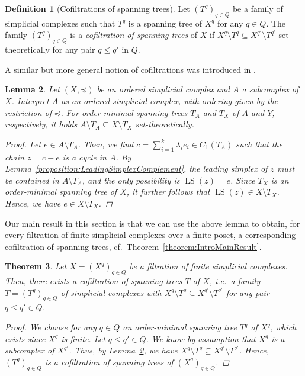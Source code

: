 \documentclass[oneside]{amsart}
\newtheorem{theorem}{Theorem}
\newtheorem{lemma}[theorem]{Lemma}
\theoremstyle{definition}
\newtheorem{definition}[theorem]{Definition}
\DeclareMathOperator\LS{LS}
\begin{document}
\begin{definition}[Cofiltrations of spanning trees]
    \label{definition:CofST}
    Let $(T^q)_{q \in Q}$ be a family of simplicial complexes such that $T^q$ is a spanning tree of $X^q$ for any $q \in Q$.
    The family $(T^q)_{q \in Q}$ is a \emph{cofiltration of spanning trees} of $X$ if $X^q \setminus T^q \subseteq X^{q'} \setminus T^{q'}$ set-theoretically for any pair $q \leq q'$ in $Q$.
\end{definition}

A similar but more general notion of cofiltrations was introduced in \cite{PatelRask2022}.

\begin{lemma}%
    \label{lemma:ClassicComplementInclusion}
    Let $(X, \mathord\preceq)$ be an ordered simplicial complex and $A$ a subcomplex of $X$.
    Interpret $A$ as an ordered simplicial complex, with ordering given by the restriction of $\mathord\preceq$.
    For order-minimal spanning trees $T_A$ and $T_X$ of $A$ and $Y$, respectively, it holds $A \setminus T_A \subseteq X \setminus T_X$ set-theoretically.

    \begin{proof}
        Let $e \in A \setminus T_A$.
        Then, we find $c = \sum_{i = 1}^k \lambda_i e_i \in C_1(T_A)$ such that the chain $z = c - e$ is a cycle in $A$.
        By Lemma~\ref{proposition:LeadingSimplexComplement}, the leading simplex of $z$ must be contained in $A \setminus T_A$, and the only possibility is $\LS(z) = e$.
        Since $T_X$ is an order-minimal spanning tree of $X$, it further follows that $\LS(z) \in X \setminus T_X$.
        Hence, we have $e \in X \setminus T_X$.
    \end{proof}    
\end{lemma}

Our main result in this section is that we can use the above lemma to obtain, for every filtration of finite simplicial complexes over a finite poset, a corresponding cofiltration of spanning trees, cf.\ Theorem~\ref{theorem:IntroMainResult}.

\begin{theorem}
    \label{theorem:MainResult}
    Let $X = (X^q)_{q \in Q}$ be a filtration of finite simplicial complexes.
    Then, there exists a cofiltration of spanning trees $T$ of $X$, i.e.\ a family $T = (T^q)_{q \in Q}$ of simplicial complexes with $X^q \setminus T^q \subseteq X^{q'} \setminus T^{q'}$ for any pair $q \leq q' \in Q$.

    \begin{proof}
        We choose for any $q \in Q$ an order-minimal spanning tree $T^q$ of $X^q$, which exists since $X^q$ is finite.
        Let $q \leq q' \in Q$.
        We know by assumption that $X^q$ is a subcomplex of $X^{q'}$.
        Thus, by Lemma~\ref{lemma:ClassicComplementInclusion}, we have $X^q \setminus T^q \subseteq X^{q'} \setminus T^{q'}$.
        Hence, $(T^q)_{q \in Q}$ is a cofiltration of spanning trees of $(X^q)_{q \in Q}$.
    \end{proof}    
\end{theorem}
\end{document}
